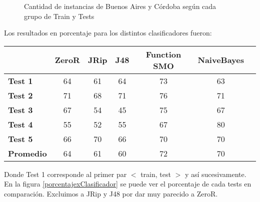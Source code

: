 \begin{figure}[H]
\centering
\pgfplotsset{width=10cm, height=4cm}
\caption{Cantidad de instancias de Buenos Aires y Córdoba según cada grupo de Train y Tests}
\label{TestsInstances}
\end{figure}

Los resultados en porcentaje para los distintos clasificadores fueron:

\begin{table}[H]
\centering
\begin{tabular}{|l|c|c|c|c|c|c|}
\hline
\textbf{}  & \textbf{ZeroR} & \textbf{JRip} & \textbf{J48} & \textbf{Function SMO} & \textbf{NaiveBayes} \\ \hline
\textbf{Test 1}  & 64 & 61 & 64 & 73 & 63 \\ \hline
\textbf{Test 2}  & 71 & 68 & 71 & 76 & 71 \\ \hline
\textbf{Test 3}  & 67 & 54 & 45 & 75 & 67 \\ \hline
\textbf{Test 4}  & 55 & 52 & 55 & 67 & 80 \\ \hline
\textbf{Test 5}  & 66 & 70 & 66 & 70 & 70 \\ \hline
\hline \hline
\textbf{Promedio} & 64 & 61 & 60 & 72 & 70 \\ \hline
\end{tabular}
\end{table}

Donde Test 1 corresponde al primer par $<$ train, test $>$ y así sucesivamente. En la figura \ref{porcentajexClasificador} se puede ver el porcentaje de cada tests en comparación. Excluimos a JRip y J48 por dar muy parecido a ZeroR.

